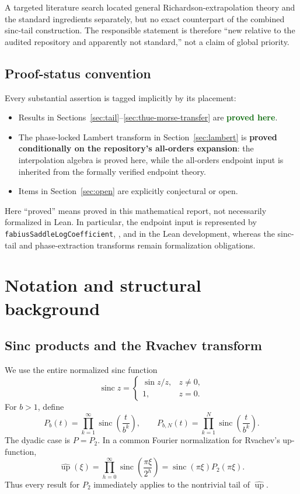 \documentclass[11pt]{article}
\theoremstyle{definition}
\theoremstyle{remark}
\newcommand{\sinc}{\operatorname{sinc}}
\newcommand{\Up}{\operatorname{up}}
\newcommand{\statusproved}{\textcolor{darkgreen}{\textbf{proved here}}}
\newcommand{\statusconditional}{\textcolor{linkblue}{\textbf{proved conditionally on the repository's all-orders expansion}}}
\begin{document}
A targeted literature search located general Richardson-extrapolation theory and the standard ingredients separately, but no exact counterpart of the combined sinc-tail construction. The responsible statement is therefore ``new relative to the audited repository and apparently not standard,'' not a claim of global priority.

\subsection{Proof-status convention}

Every substantial assertion is tagged implicitly by its placement:
\begin{itemize}
\item Results in Sections~\ref{sec:tail}--\ref{sec:thue-morse-transfer} are \statusproved.
\item The phase-locked Lambert transform in Section~\ref{sec:lambert} is \statusconditional:
the interpolation algebra is proved here, while the all-orders endpoint input is inherited
from the formally verified endpoint theory.
\item Items in Section~\ref{sec:open} are explicitly conjectural or open.
\end{itemize}
Here ``proved'' means proved in this mathematical report, not necessarily formalized in
Lean.  In particular, the endpoint input is represented by
\texttt{fabiusSaddleLogCoefficient},
, and
 in the Lean development,
whereas the sinc-tail and phase-extraction transforms remain formalization obligations.

\section{Notation and structural background}
\label{sec:notation}

\subsection{Sinc products and the Rvachev transform}

We use the entire normalized sinc function
\[
\sinc z=\begin{cases}\sin z/z,&z\ne0,\\1,&z=0.\end{cases}
\]
For $b>1$, define
\begin{equation}
P_b(t)=\prod_{k=1}^{\infty}\sinc\!\left(\frac{t}{b^k}\right),
\qquad
P_{b,N}(t)=\prod_{k=1}^{N}\sinc\!\left(\frac{t}{b^k}\right).
\label{eq:Pb-def}
\end{equation}
The dyadic case is $P=P_2$. In a common Fourier normalization for Rvachev's up-function,
\begin{equation}
\widehat{\Up}(\xi)=\prod_{h=0}^{\infty}\sinc\!\left(\frac{\pi\xi}{2^h}\right)
=\sinc(\pi\xi)P_2(\pi\xi).
\label{eq:up-factor}
\end{equation}
Thus every result for $P_2$ immediately applies to the nontrivial tail of $\widehat{\Up}$.
\end{document}
